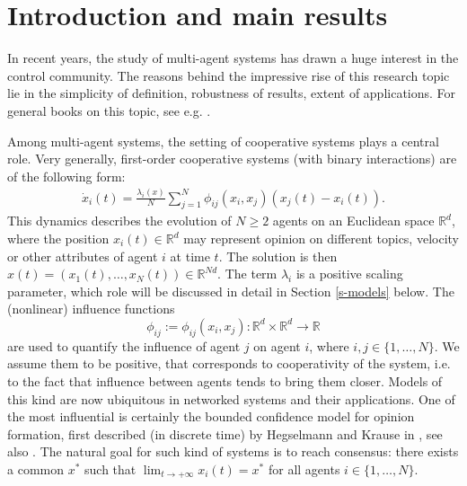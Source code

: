 \documentclass[journal]{article}
\newcommand{\R}{\mathbb{R}}
\begin{document}

 \maketitle

\section{Introduction and main results}

In recent years, the study of multi-agent systems  has drawn a huge interest in the control community. The reasons behind the impressive rise of this research topic lie in the simplicity of definition, robustness of results, extent of  applications. For general books on this topic, see e.g. \cite{bullo2009distributed,nedich2015convergence,mesbahi2010graph}. 

Among multi-agent systems, the setting of cooperative systems plays a central role. Very generally, first-order cooperative systems (with binary interactions) are of the following form:
\begin{eqnarray}\label{e-ODE-noM}
    \dot{x}_i(t) = \frac{\lambda_i(x)}{N}\sum_{j=1}^{N} \phi_{ij}(x_i,x_j) (x_j(t) - x_i(t)).
\end{eqnarray}
This dynamics describes the evolution of $N \geq 2$ agents on an Euclidean space $\R^d$, where the position $x_i(t) \in \R^d$ may represent opinion on different topics, velocity or other attributes of agent $i$ at time $t$. The solution is then $x(t)=(x_1(t),\ldots,x_N(t))\in \R^{Nd}$. The term $\lambda_i$ is a positive scaling parameter, which role will be discussed in detail in Section \ref{s-models} below. The (nonlinear) influence functions 
\begin{equation}
\label{e-phi}
\phi_{ij}:=\phi_{ij}(x_i,x_j) :\R^d\times \R^{d}\to\R
\end{equation} are used to quantify the influence of agent $j$ on agent $i$, where $i,j\in\{1,\ldots,N\}$. We assume them to be positive, that corresponds to cooperativity of the system, i.e. to the fact that influence between agents tends to bring them closer. Models of this kind are now ubiquitous in networked systems and their applications. One of the most influential is certainly the bounded confidence model for opinion formation, first described (in discrete time) by Hegselmann and Krause in \cite{HK}, see also \cite{rateHK,rateHK2}. The natural goal for such kind of systems is to reach consensus: there exists a common $x^*$ such that $\lim_{t\to +\infty} x_i(t)=x^*$ for all agents $i \in \{1,\ldots,N\}$.
\end{document}
